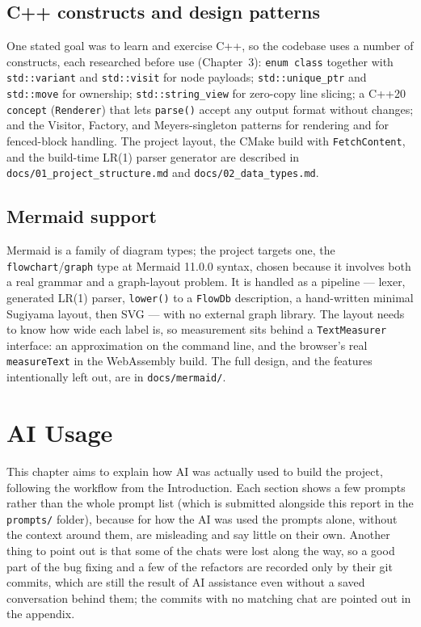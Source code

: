 \documentclass[12pt]{report}
\begin{document}
\section{C++ constructs and design patterns}

One stated goal was to learn and exercise C++, so the codebase uses a number of constructs, each researched before use (Chapter~3): \verb|enum class| together with \verb|std::variant| and \verb|std::visit| for node payloads; \verb|std::unique_ptr| and \verb|std::move| for ownership; \verb|std::string_view| for zero-copy line slicing; a C++20 \verb|concept| (\verb|Renderer|) that lets \verb|parse()| accept any output format without changes; and the Visitor, Factory, and Meyers-singleton patterns for rendering and for fenced-block handling. The project layout, the CMake build with \verb|FetchContent|, and the build-time LR(1) parser generator are described in \verb|docs/01_project_structure.md| and \verb|docs/02_data_types.md|.

\section{Mermaid support}

Mermaid is a family of diagram types; the project targets one, the \verb|flowchart|/\verb|graph| type at Mermaid 11.0.0 syntax, chosen because it involves both a real grammar and a graph-layout problem. It is handled as a pipeline --- lexer, generated LR(1) parser, \verb|lower()| to a \verb|FlowDb| description, a hand-written minimal Sugiyama layout, then SVG --- with no external graph library. The layout needs to know how wide each label is, so measurement sits behind a \verb|TextMeasurer| interface: an approximation on the command line, and the browser's real \verb|measureText| in the WebAssembly build. The full design, and the features intentionally left out, are in \verb|docs/mermaid/|.

\chapter{AI Usage}

This chapter aims to explain how AI was actually used to build the project, following the workflow from the Introduction. Each section shows a few prompts rather than the whole prompt list (which is submitted alongside this report in the \verb|prompts/| folder), because for how the AI was used the prompts alone, without the context around them, are misleading and say little on their own. Another thing to point out is that some of the chats were lost along the way, so a good part of the bug fixing and a few of the refactors are recorded only by their git commits, which are still the result of AI assistance even without a saved conversation behind them; the commits with no matching chat are pointed out in the appendix.
\end{document}
